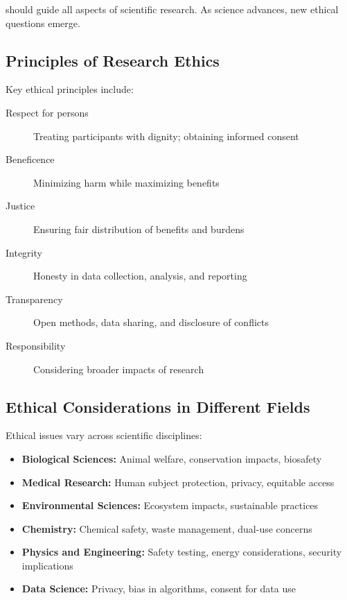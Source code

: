 \documentclass[justified,notoc]{tufte-book}
\newenvironment{keyconcept}[1]{%
    \begin{tcolorbox}[colback=primary!5,colframe=primary,title=\textbf{Key Concept: #1}]
}{%
    \end{tcolorbox}
}
\begin{document}
 should guide all aspects of scientific research. As science advances, new ethical questions emerge.

\subsection{Principles of Research Ethics}

Key ethical principles include:

\begin{keyconcept}{Core Ethical Principles in Research}
\begin{description}
    \item[Respect for persons] Treating participants with dignity; obtaining informed consent
    \item[Beneficence] Minimizing harm while maximizing benefits
    \item[Justice] Ensuring fair distribution of benefits and burdens
    \item[Integrity] Honesty in data collection, analysis, and reporting
    \item[Transparency] Open methods, data sharing, and disclosure of conflicts
    \item[Responsibility] Considering broader impacts of research
\end{description}
\end{keyconcept}

\subsection{Ethical Considerations in Different Fields}

Ethical issues vary across scientific disciplines:

\begin{itemize}
    \item \textbf{Biological Sciences:} Animal welfare, conservation impacts, biosafety
    \item \textbf{Medical Research:} Human subject protection, privacy, equitable access
    \item \textbf{Environmental Sciences:} Ecosystem impacts, sustainable practices
    \item \textbf{Chemistry:} Chemical safety, waste management, dual-use concerns
    \item \textbf{Physics and Engineering:} Safety testing, energy considerations, security implications
    \item \textbf{Data Science:} Privacy, bias in algorithms, consent for data use
\end{itemize}
\end{document}
